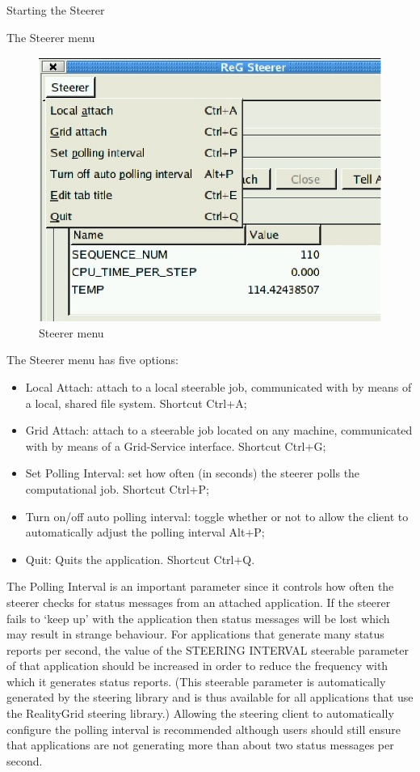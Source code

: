 \documentclass[a4paper,twoside]{article}
\begin{document}
\begin{section}{Starting the Steerer}
\begin{subsection}{The Steerer menu}
\begin{figure}
\centerline{\includegraphics{Steerer_menu.eps}}
\caption{Steerer menu}
\label{fig:steerer_menu}
\end{figure}

The Steerer menu has five options:
\begin{itemize}
\item Local Attach: attach to a local steerable job, 
communicated with by means of a local, shared file system. 
Shortcut Ctrl+A;
\item Grid Attach: attach to a steerable job located on 
any machine, communicated with by means of a Grid-Service 
interface. Shortcut Ctrl+G;
\item Set Polling Interval: set how often (in seconds) the 
steerer polls the computational job. Shortcut Ctrl+P;
\item Turn on/off auto polling interval: toggle whether or not 
to allow the client to automatically adjust the polling interval Alt+P;
\item Quit: Quits the application. Shortcut Ctrl+Q.
\end{itemize}

The Polling Interval is an important parameter since it controls how
often the steerer checks for status messages from an attached
application.  If the steerer fails to `keep up' with the application
then status messages will be lost which may result in strange
behaviour.  For applications that generate many status reports per
second, the value of the STEERING INTERVAL steerable parameter of
that application should be increased in order to reduce the frequency
with which it generates status reports. (This steerable parameter is
automatically generated by the steering library and is thus available
for all applications that use the RealityGrid steering library.)
Allowing the steering client to automatically configure the polling
interval is recommended although users should still ensure that
applications are not generating more than about two status messages
per second.


\end{subsection}
\end{section}
\end{document}
